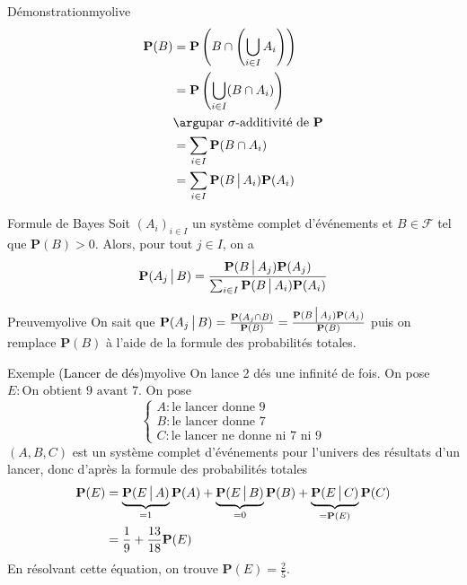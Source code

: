     \begin{demo}{Démonstration}{myolive}
        \begin{align*}
            \mathbf{P}(B) 
            &= \mathbf{P}\left(B \cap \left(\bigcup_{i \in I} A_i\right)\right) \\
            &= \mathbf{P}\left(\bigcup_{i \in I} (B \cap A_i)\right) \\
            &\argu \text{par } \sigma\text{-additivité de } \mathbf{P} \\
            &= \sum_{i \in I} \mathbf{P}(B \cap A_i) \\
            &= \sum_{i \in I} \mathbf{P}(B \tq A_i) \mathbf{P}(A_i)
        \end{align*}
    \end{demo}

    \begin{prop}{Formule de Bayes}{}
        Soit $(A_i)_{i \in I}$ un système complet d’événements et $B \in \mathcal{F}$ tel que $\mathbf{P}(B) > 0$. Alors, pour tout $j \in I$, on a 
        \[ \mathbf{P}(A_j \, \big| \, B) = \frac{\mathbf{P}(B \, \big| \, A_j) \mathbf{P}(A_j)}{\sum_{i \in I} \mathbf{P}(B \, \big| \, A_i) \mathbf{P}(A_i)} \]    
    \end{prop}

    \begin{demo}{Preuve}{myolive}
        On sait que $\mathbf{P}(A_j \, \big| \, B) = \frac{\mathbf{P}(A_j \cap B)}{\mathbf{P}(B)} = \frac{\mathbf{P}(B \, \big| \, A_j)\mathbf{P}(A_j)}{\mathbf{P}(B)}$ puis on remplace $\mathbf{P}(B)$ à l’aide de la formule des probabilités totales.
    \end{demo}

    \begin{omed}{Exemple \textcolor{black}{(Lancer de dés)}}{myolive}
        On lance 2 dés une infinité de fois. On pose $E : \text{On obtient 9 avant 7}$. On pose 
        \[ \left\{ \begin{array}{l}
            A : \text{le lancer donne 9} \\
            B : \text{le lancer donne 7} \\
            C : \text{le lancer ne donne ni 7 ni 9}
        \end{array} \right. \]
        $(A, B, C)$ est un système complet d’événements pour l’univers des résultats d’un lancer, donc d’après la formule des probabilités totales 
        \begin{align*}
            \mathbf{P}(E) 
            &= \underbrace{\mathbf{P}(E \, \big| \, A)}_{= 1} \mathbf{P}(A) + \underbrace{\mathbf{P}(E \, \big| \, B)}_{= 0} \mathbf{P}(B) + \underbrace{\mathbf{P}(E \, \big| \, C)}_{= \mathbf{P}(E)} \mathbf{P}(C) \\
            &= \frac{1}{9} + \frac{13}{18} \mathbf{P}(E) 
        \end{align*}
        En résolvant cette équation, on trouve $\mathbf{P}(E) = \frac{2}{5}$.
    \end{omed}

